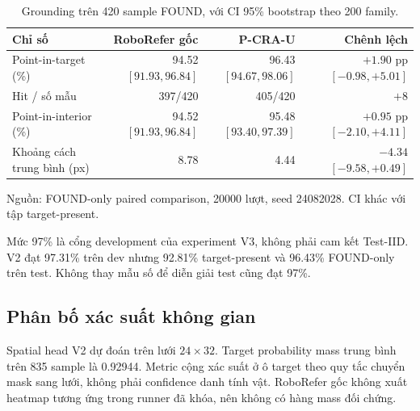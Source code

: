 \begin{table}[htbp]
    \centering
    \setlength{\tabcolsep}{4pt}
    \renewcommand{\arraystretch}{1.15}
    \caption{Grounding trên 420 sample FOUND, với CI 95\%
    bootstrap theo 200 family.}
    \label{tab:results-found-grounding}
    \small
    \begin{tabularx}{\textwidth}{@{}>{\raggedright\arraybackslash}Xrrr@{}}
        \toprule
        Chỉ số & RoboRefer gốc & P-CRA-U & Chênh lệch \\
        \midrule
        Point-in-target (\%) &
        \shortstack{94.52\\$[91.93,96.84]$} &
        \shortstack{96.43\\$[94.67,98.06]$} &
        \shortstack{$+1.90$ pp\\$[-0.98,+5.01]$} \\
        Hit / số mẫu & 397/420 & 405/420 & $+8$ \\
        Point-in-interior (\%) &
        \shortstack{94.52\\$[91.93,96.84]$} &
        \shortstack{95.48\\$[93.40,97.39]$} &
        \shortstack{$+0.95$ pp\\$[-2.10,+4.11]$} \\
        Khoảng cách trung bình (px) & 8.78 & 4.44 &
        \shortstack{$-4.34$\\$[-9.58,+0.49]$} \\
        \bottomrule
    \end{tabularx}
    \vspace{2pt}
    {\footnotesize\raggedright Nguồn: FOUND-only paired comparison,
    20000 lượt, seed 24082028. CI khác với tập target-present.\par}
\end{table}

Mức 97\% là cổng development của experiment V3, không
phải cam kết Test-IID. V2 đạt 97.31\% trên dev nhưng
92.81\% target-present và 96.43\% FOUND-only trên test.
Không thay mẫu số để diễn giải test cũng đạt 97\%.

\subsection{Phân bố xác suất không gian}

Spatial head V2 dự đoán trên lưới $24\times32$.
Target probability mass trung bình trên 835 sample là
0.92944. Metric cộng xác suất ở ô target theo quy tắc
chuyển mask sang lưới, không phải confidence danh tính
vật. RoboRefer gốc không xuất heatmap tương ứng trong
runner đã khóa, nên không có hàng mass đối chứng.

